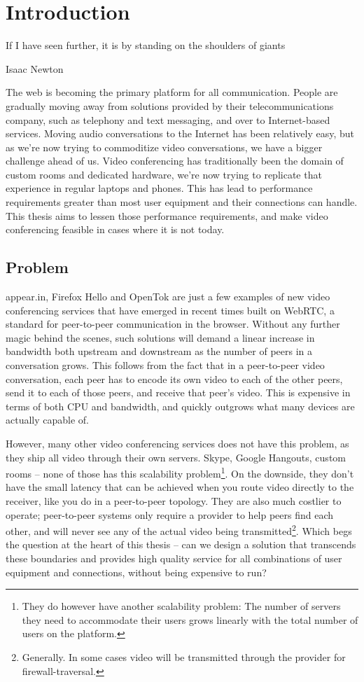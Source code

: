 \chapter{Introduction}\label{chp:introduction}

\epigraph{If I have seen further, it is by standing on the shoulders of giants}{Isaac Newton}

The web is becoming the primary platform for all communication. People are gradually moving away from solutions provided by their telecommunications company, such as telephony and text messaging, and over to Internet-based services. Moving audio conversations to the Internet has been relatively easy, but as we're now trying to commoditize video conversations, we have a bigger challenge ahead of us. Video conferencing has traditionally been the domain of custom rooms and dedicated hardware, we're now trying to replicate that experience in regular laptops and phones. This has lead to performance requirements greater than most user equipment and their connections can handle. This thesis aims to lessen those performance requirements, and make video conferencing feasible in cases where it is not today.


\section{Problem}

appear.in, Firefox Hello and OpenTok are just a few examples of new video conferencing services that have emerged in recent times built on WebRTC, a standard for peer-to-peer communication in the browser. Without any further magic behind the scenes, such solutions will demand a linear increase in bandwidth both upstream and downstream as the number of peers in a conversation grows. This follows from the fact that in a peer-to-peer video conversation, each peer has to encode its own video to each of the other peers, send it to each of those peers, and receive that peer's video. This is expensive in terms of both CPU and bandwidth, and quickly outgrows what many devices are actually capable of.

However, many other video conferencing services does not have this problem, as they ship all video through their own servers. Skype, Google Hangouts, custom rooms -- none of those has this scalability problem\footnote{They do however have another scalability problem: The number of servers they need to accommodate their users grows linearly with the total number of users on the platform.}. On the downside, they don't have the small latency that can be achieved when you route video directly to the receiver, like you do in a peer-to-peer topology. They are also much costlier to operate; peer-to-peer systems only require a provider to help peers find each other, and will never see any of the actual video being transmitted\footnote{Generally. In some cases video will be transmitted through the provider for firewall-traversal.}. Which begs the question at the heart of this thesis -- can we design a solution that transcends these boundaries and provides high quality service for all combinations of user equipment and connections, without being expensive to run?


